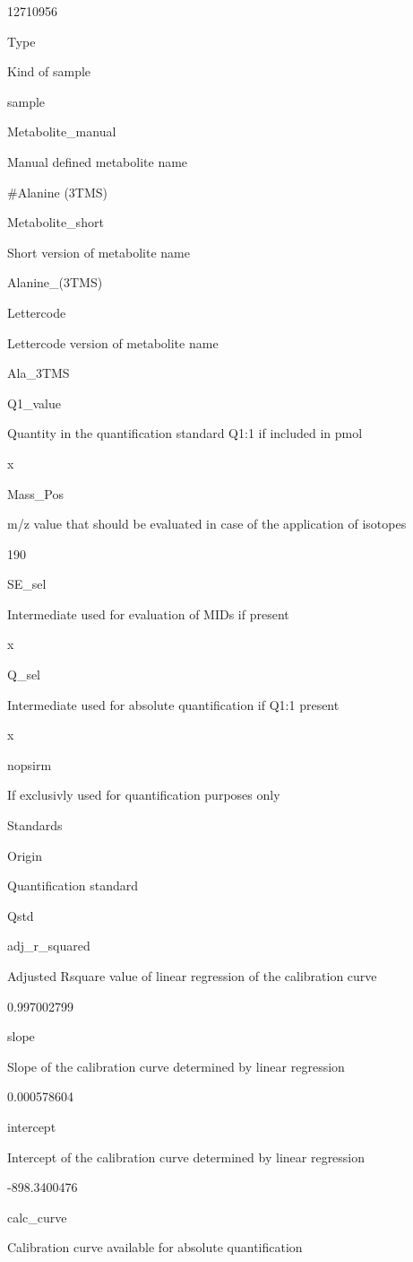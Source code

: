 \documentclass[]{book}
\theoremstyle{definition}
\theoremstyle{definition}
\theoremstyle{definition}
\theoremstyle{remark}
\begin{document}
12710956

Type

Kind of sample

sample

Metabolite\_manual

Manual defined metabolite name

\#Alanine (3TMS)

Metabolite\_short

Short version of metabolite name

Alanine\_(3TMS)

Lettercode

Lettercode version of metabolite name

Ala\_3TMS

Q1\_value

Quantity in the quantification standard Q1:1 if included in pmol

x

Mass\_Pos

m/z value that should be evaluated in case of the application of
isotopes

190

SE\_sel

Intermediate used for evaluation of MIDs if present

x

Q\_sel

Intermediate used for absolute quantification if Q1:1 present

x

nopsirm

If exclusivly used for quantification purposes only

Standards

Origin

Quantification standard

Qstd

adj\_r\_squared

Adjusted Rsquare value of linear regression of the calibration curve

0.997002799

slope

Slope of the calibration curve determined by linear regression

0.000578604

intercept

Intercept of the calibration curve determined by linear regression

-898.3400476

calc\_curve

Calibration curve available for absolute quantification
\end{document}
